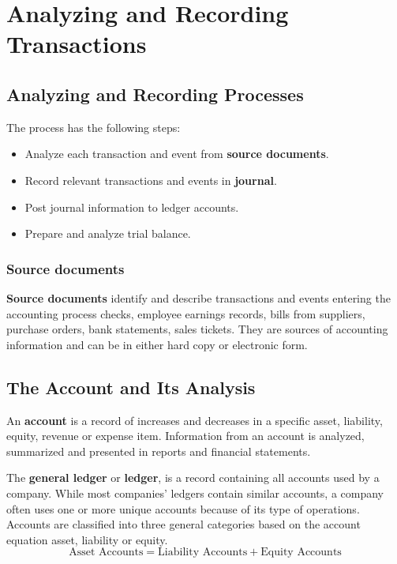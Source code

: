 \documentclass[../main.tex]{subfiles}
\begin{document}
	\section{Analyzing and Recording Transactions}
	
	\subsection{Analyzing and Recording Processes}
	
	The process has the following steps:
	\begin{itemize}[noitemsep]
		\item Analyze each transaction and event from \textbf{source documents}.
		\item Record relevant transactions and events in \textbf{journal}.
		\item Post journal information to ledger accounts.
		\item Prepare and analyze trial balance.  
	\end{itemize}
	
	\subsubsection{Source documents}
	
	\textbf{Source documents} identify and describe transactions and events 
	entering the accounting process \eg checks, employee earnings records, 
	bills from suppliers, purchase orders, bank statements, sales tickets. They 
	are sources of accounting information 
	and can be in either hard copy or electronic form. 
	
	\subsection{The Account and Its Analysis}
	
	An \textbf{account} is a record of increases and decreases in a specific 
	asset, liability, equity, revenue or expense item. Information from an 
	account is analyzed, summarized and presented in reports and financial 
	statements. 
	
	The \textbf{general ledger} or \textbf{ledger}, is a record 
	containing all accounts used by a company. While most companies' ledgers 
	contain similar accounts, a company often uses one or more unique accounts 
	because of its type of operations. Accounts are classified into three 
	general categories based on the account equation \ie asset, liability or 
	equity. 
	\[
	\text{Asset Accounts} = \text{Liability Accounts} + \text{Equity Accounts}
	\]
	
\end{document}
